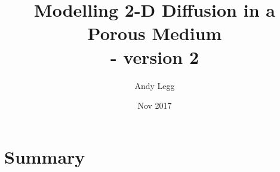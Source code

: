 \documentclass[11pt]{article}
\title{Modelling 2-D Diffusion in a Porous Medium \\ - version 2}
\author{Andy Legg}
\date{Nov 2017}
\newcommand{\ul}{\underline}
\newcommand{\Om}{\Omega}
\newcommand{\al}{\mathrm{\alpha}}
\begin{document}
\maketitle
\section{Summary}
\end{document}
